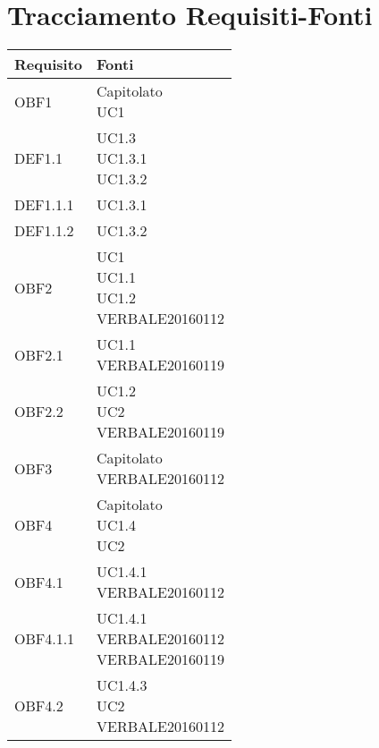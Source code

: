 \documentclass{scalatekids-article}
\begin{document}
\section{Tracciamento Requisiti-Fonti}
\begin{longtable}[H]{|p{5.5cm}|p{5.5cm}|}
  \hline
  \textbf{Requisito} & \textbf{Fonti}\\
  \hline
  OBF1 & \multiLineCell[t]{Capitolato\\UC1\\}\\
  \hline
  DEF1.1 & \multiLineCell[t]{UC1.3\\UC1.3.1\\UC1.3.2\\}\\
  \hline
  DEF1.1.1 & \multiLineCell[t]{UC1.3.1\\}\\
  \hline
  DEF1.1.2 & \multiLineCell[t]{UC1.3.2\\}\\
  \hline
  OBF2 & \multiLineCell[t]{UC1\\UC1.1\\UC1.2\\VERBALE20160112\\}\\
  \hline
  OBF2.1 & \multiLineCell[t]{UC1.1\\VERBALE20160119\\}\\
  \hline
  OBF2.2 & \multiLineCell[t]{UC1.2\\UC2\\VERBALE20160119\\}\\
  \hline
  OBF3 & \multiLineCell[t]{Capitolato\\VERBALE20160112\\}\\
  \hline
  OBF4 & \multiLineCell[t]{Capitolato\\UC1.4\\UC2\\}\\
  \hline
  OBF4.1 & \multiLineCell[t]{UC1.4.1\\VERBALE20160112\\}\\
  \hline
  OBF4.1.1 & \multiLineCell[t]{UC1.4.1\\VERBALE20160112\\VERBALE20160119\\}\\
  \hline
  OBF4.2 & \multiLineCell[t]{UC1.4.3\\UC2\\VERBALE20160112\\}\\

\end{longtable}
\end{document}

